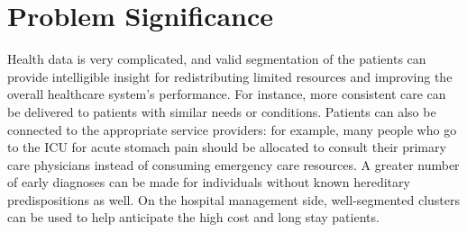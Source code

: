 \documentclass{article}
\begin{document}
\section{Problem Significance}
Health data is very complicated, and valid segmentation of the patients can provide intelligible insight for redistributing limited resources and improving the overall healthcare system’s performance. For instance, more consistent care can be delivered to patients with similar needs or conditions. Patients can also be connected to the appropriate service providers: for example, many people who go to the ICU for acute stomach pain should be allocated to consult their primary care physicians instead of consuming emergency care resources. A greater number of early diagnoses can be made for individuals without known hereditary predispositions as well. On the hospital management side, well-segmented clusters can be used to help anticipate the high cost and long stay patients.
\end{document}
